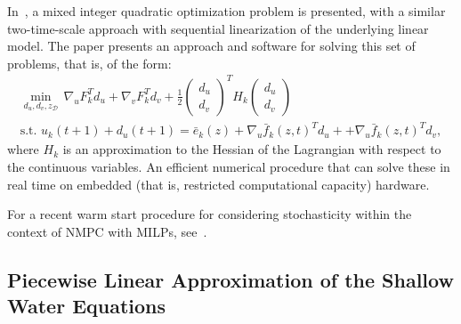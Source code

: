 \documentclass{article}
\newcommand{\1}{\mathds{1}}          %
\theoremstyle{definition}
\begin{document}
\begin{sloppypar}
In~\cite{quirynen2021sequential}, a mixed integer quadratic optimization problem is presented, with a similar two-time-scale approach with sequential linearization of the underlying linear model. The paper presents an approach and software for solving this set of problems, that is, of the form:
\[
\begin{array}{l}
\min\limits_{d_u,d_v,z_{\mathcal{D}}}\, \nabla_{u} F_k^T d_u
+\nabla_{v} F_k^T d_v +\frac{1}{2} \begin{pmatrix} d_u \\ d_v \end{pmatrix}^T H_k \begin{pmatrix} d_u \\ d_v \end{pmatrix}  \\
\text{s.t.   } u_k(t+1)+d_u(t+1) = \bar e_k(z)+\nabla_u\bar{f}_k (z,t)^T d_u++\nabla_u\bar{f}_k (z,t)^T d_v,
\end{array}
\]
where $H_k$ is an approximation to the Hessian of the Lagrangian with respect to the continuous variables. An efficient numerical procedure that can solve these in real time on embedded (that is, restricted computational capacity) hardware. 



For a recent warm start procedure for considering stochasticity within the context of NMPC with MILPs, see~\cite{markhorst2024two}. 

\subsection{Piecewise Linear Approximation of the Shallow Water Equations} \label{sec:pwLinearApproxSWE}


\end{sloppypar}
\end{document}
